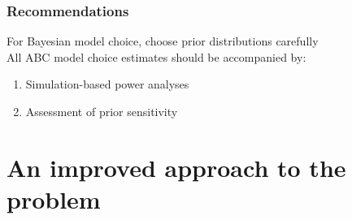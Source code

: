 \begin{frame}
    \frametitle{Recommendations}
    For Bayesian model choice, choose prior distributions carefully\\
    \bigskip
    All ABC model choice estimates should be accompanied by:
    \begin{enumerate}
        \item Simulation-based power analyses
        \item Assessment of prior sensitivity
    \end{enumerate}
    \medskip
\end{frame}

\section{An improved approach to the problem}

